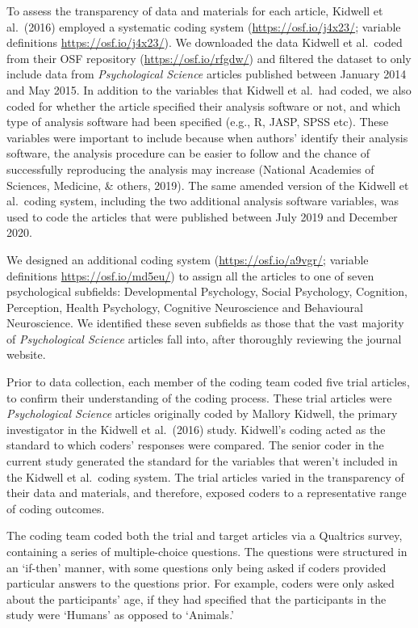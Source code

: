 \documentclass[
  english,
  man,floatsintext]{apa6}
\begin{document}
To assess the transparency of data and materials for each article, Kidwell et al.~(2016) employed a systematic coding system (\url{https://osf.io/j4x23/}; variable definitions \url{https://osf.io/j4x23/}). We downloaded the data Kidwell et al.~coded from their OSF repository (\url{https://osf.io/rfgdw/}) and filtered the dataset to only include data from \emph{Psychological Science} articles published between January 2014 and May 2015.
In addition to the variables that Kidwell et al.~had coded, we also coded for whether the article specified their analysis software or not, and which type of analysis software had been specified (e.g., R, JASP, SPSS etc). These variables were important to include because when authors' identify their analysis software, the analysis procedure can be easier to follow and the chance of successfully reproducing the analysis may increase (National Academies of Sciences, Medicine, \& others, 2019).
The same amended version of the Kidwell et al.~coding system, including the two additional analysis software variables, was used to code the articles that were published between July 2019 and December 2020.

We designed an additional coding system (\url{https://osf.io/a9vgr/}; variable definitions \url{https://osf.io/md5eu/}) to assign all the articles to one of seven psychological subfields: Developmental Psychology, Social Psychology, Cognition, Perception, Health Psychology, Cognitive Neuroscience and Behavioural Neuroscience. We identified these seven subfields as those that the vast majority of \emph{Psychological Science} articles fall into, after thoroughly reviewing the journal website.

Prior to data collection, each member of the coding team coded five trial articles, to confirm their understanding of the coding process. These trial articles were \emph{Psychological Science} articles originally coded by Mallory Kidwell, the primary investigator in the Kidwell et al.~(2016) study. Kidwell's coding acted as the standard to which coders' responses were compared. The senior coder in the current study generated the standard for the variables that weren't included in the Kidwell et al.~coding system. The trial articles varied in the transparency of their data and materials, and therefore, exposed coders to a representative range of coding outcomes.

The coding team coded both the trial and target articles via a Qualtrics survey, containing a series of multiple-choice questions. The questions were structured in an `if-then' manner, with some questions only being asked if coders provided particular answers to the questions prior. For example, coders were only asked about the participants' age, if they had specified that the participants in the study were `Humans' as opposed to `Animals.'
\end{document}
